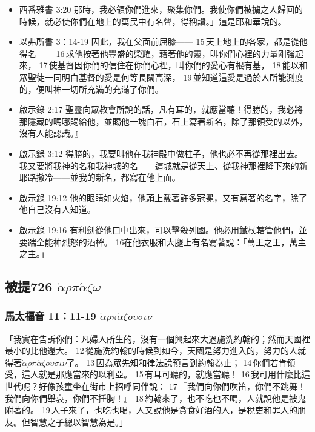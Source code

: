 \begin{itemize}
\item 西番雅書 3:20
那時，我必領你們進來，聚集你們。我使你們被擄之人歸回的時候，就必使你們在地上的萬民中有名聲，得稱讚。」這是耶和華說的。
\item 以弗所書 3：14-19
因此，我在父面前屈膝—— 15 天上地上的各家，都是從他得名—— 16 求他按著他豐盛的榮耀，藉著他的靈，叫你們心裡的力量剛強起來， 17 使基督因你們的信住在你們心裡，叫你們的愛心有根有基， 18 能以和眾聖徒一同明白基督的愛是何等長闊高深， 19 並知道這愛是過於人所能測度的，便叫神一切所充滿的充滿了你們。
\item 啟示錄 2:17
聖靈向眾教會所說的話，凡有耳的，就應當聽！得勝的，我必將那隱藏的嗎哪賜給他，並賜他一塊白石，石上寫著新名，除了那領受的以外，沒有人能認識。』
\item 啟示錄 3:12
得勝的，我要叫他在我神殿中做柱子，他也必不再從那裡出去。我又要將我神的名和我神城的名——這城就是從天上、從我神那裡降下來的新耶路撒冷——並我的新名，都寫在他上面。
\item 啟示錄 19:12
他的眼睛如火焰，他頭上戴著許多冠冕，又有寫著的名字，除了他自己沒有人知道。
\item 啟示錄 19:16
有利劍從他口中出來，可以擊殺列國。他必用鐵杖轄管他們，並要踹全能神烈怒的酒榨。 16在他衣服和大腿上有名寫著說：「萬王之王，萬主之主。」
\end{itemize} 





\subsection{被提726 $\grave{\alpha}$$\rho$$\pi
$$\acute{\alpha}$$\zeta$$\omega$}

\subsubsection{馬太福音 11：11-19 $\grave{\alpha}$$\rho$$\pi$$\acute{\alpha}$$\zeta$$o$$\upsilon$$\sigma$$\iota$$\nu$}
「我實在告訴你們：凡婦人所生的，沒有一個興起來大過施洗約翰的；然而天國裡最小的比他還大。 12 從施洗約翰的時候到如今，天國是努力進入的，努力的人就\underline{得著$\grave{\alpha}$$\rho$$\pi$$\acute{\alpha}$$\zeta$$o$$\upsilon$$\sigma$$\iota$$\nu$}了。 13 因為眾先知和律法說預言到約翰為止； 14 你們若肯領受，這人就是那應當來的以利亞。 15 有耳可聽的，就應當聽！ 16 我可用什麼比這世代呢？好像孩童坐在街市上招呼同伴說： 17 『我們向你們吹笛，你們不跳舞！我們向你們舉哀，你們不捶胸！』 18 約翰來了，也不吃也不喝，人就說他是被鬼附著的。 19 人子來了，也吃也喝，人又說他是貪食好酒的人，是稅吏和罪人的朋友。但智慧之子總以智慧為是。」

